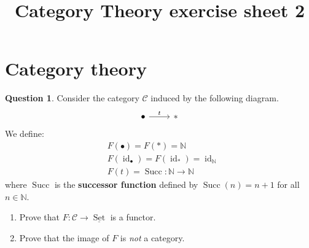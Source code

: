 \documentclass[12pt]{article}
\title{Category Theory exercise sheet 2}
\theoremstyle{plain}
\theoremstyle{definition}
\newtheorem{question}[thm]{Question}
\newcommand{\bb}[1]{\mathbb{#1}}
\newcommand{\scr}[1]{\mathscr{#1}}
\newcommand{\lto}{\longrightarrow}
\begin{document}
	
	\maketitle
	
	\section{Category theory}
	\begin{question}
		Consider the category $\scr{C}$ induced by the following diagram.
		\begin{equation}
			\begin{tikzcd}
				\bullet \arrow[r,"{t}"] & \ast
			\end{tikzcd}
		\end{equation}
		We define:
		\begin{align*}
			&F(\bullet) = F(\ast) = \bb{N}\\
			&F(\operatorname{id}_\bullet) = F(\operatorname{id}_{\ast}) = \operatorname{id}_{\bb{N}}\\
			&F(t) = \operatorname{Succ}: \bb{N} \lto \bb{N}
		\end{align*}
		where $\operatorname{Succ}$ is the \textbf{successor function} defined by $\operatorname{Succ}(n) = n + 1$ for all $n \in \bb{N}$.
		\begin{enumerate}
			\item 
			Prove that $F: \scr{C} \lto \underline{\operatorname{Set}}$ is a functor.
		
			\item Prove that the image of $F$ is \emph{not} a category.
			\end{enumerate}
		\end{question}
	
\end{document}
